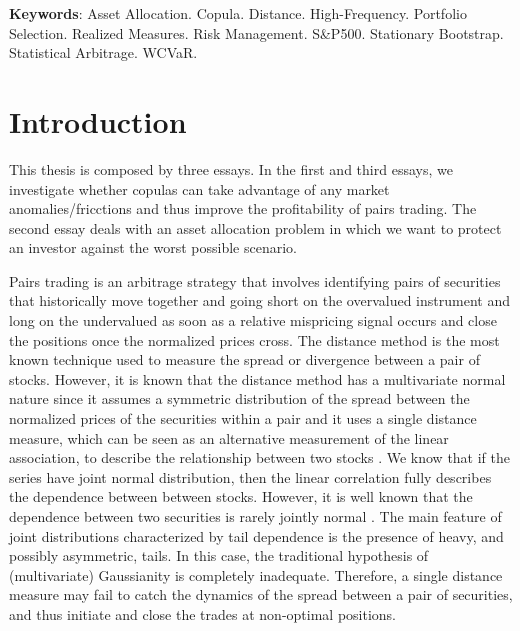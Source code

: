 \documentclass[a4paper,12pt]{report}
\begin{document}
	\noindent
	\textbf{Keywords}: Asset Allocation. Copula. Distance. High-Frequency. Portfolio Selection. Realized Measures. Risk Management. S\&P500. Stationary Bootstrap. Statistical Arbitrage. WCVaR.
	
	
	
	\thispagestyle{empty}
	\renewcommand{\contentsname}{\center{Sumário}}
	\tableofcontents
	\thispagestyle{empty}
	
	
	\chapter{Introduction}
	\thispagestyle{myheadings}
	\markright{}
	
	\setcounter{page}{10}
	
	
	
	\setlength{\baselineskip}{12pt}
	
	This thesis is composed by three essays. In the first and third essays, we investigate whether copulas can take advantage of any market anomalies/fricctions and thus improve the profitability of pairs trading. The second essay deals with an asset allocation problem in which we want to protect an investor against the worst possible scenario.
	
	Pairs trading is an arbitrage strategy that involves identifying pairs of securities that historically move together and going short on the overvalued instrument and long on the undervalued as soon as a relative mispricing signal occurs and close the positions once the normalized prices cross. The distance method is the most known technique used to measure the spread or divergence between a pair of stocks. However, it is known that the distance method has a multivariate normal nature since it assumes a symmetric distribution of the spread between the normalized prices of the securities within a pair and it uses a single distance measure, which can be seen as an alternative measurement of the linear association, to describe the relationship between two stocks \citep{xie14}. We know that if the series have joint normal distribution, then the linear correlation fully describes the dependence between between stocks. However, it is well known that the dependence between two securities is rarely jointly normal \citep{campbell97,cont01,ane03,mcneil15}. The main feature of joint distributions characterized by tail dependence is the presence of heavy, and possibly asymmetric, tails. In this case, the traditional hypothesis of (multivariate) Gaussianity is completely inadequate. Therefore, a single distance measure may fail to catch the dynamics of the spread between a pair of securities, and thus initiate and close the trades at non-optimal positions.
	
\end{document}
